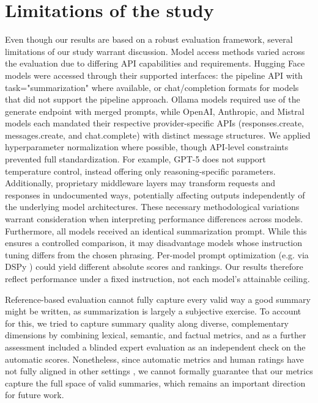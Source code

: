
\section{Limitations of the study}

Even though our results are based on a robust evaluation framework, several limitations of our study warrant discussion. Model access methods varied across the evaluation due to differing \ac{API} capabilities and requirements. Hugging Face models were accessed through their supported interfaces: the pipeline \ac{API} with task="summarization" where available, or chat/completion formats for models that did not support the pipeline approach. Ollama models required use of the generate endpoint with merged prompts, while OpenAI, Anthropic, and Mistral models each mandated their respective provider-specific \acp{API} (responses.create, messages.create, and chat.complete) with distinct message structures. We applied hyperparameter normalization where possible, though \ac{API}-level constraints prevented full standardization. For example, GPT-5 does not support temperature control, instead offering only reasoning-specific parameters. Additionally, proprietary middleware layers may transform requests and responses in undocumented ways, potentially affecting outputs independently of the underlying model architectures. These necessary methodological variations warrant consideration when interpreting performance differences across models. Furthermore, all models received an identical summarization prompt. While this ensures a controlled comparison, it may disadvantage models whose instruction tuning differs from the chosen phrasing. Per-model prompt optimization (e.g. via DSPy \cite{khattab2023dspycompilingdeclarativelanguage, khattab2023demonstratesearchpredictcomposingretrievallanguage}) could yield different absolute scores and rankings. Our results therefore reflect performance under a fixed instruction, not each model's attainable ceiling.

Reference-based evaluation cannot fully capture every valid way a good summary might be written, as summarization is largely a subjective exercise. To account for this, we tried to capture summary quality along diverse, complementary dimensions by combining lexical, semantic, and factual metrics, and as a further assessment included a blinded expert evaluation as an independent check on the automatic scores. Nonetheless, since automatic metrics and human ratings have not fully aligned in other settings \cite{chen2025benchmarking, celikten2025benchmarking}, we cannot formally guarantee that our metrics capture the full space of valid summaries, which remains an important direction for future work.

